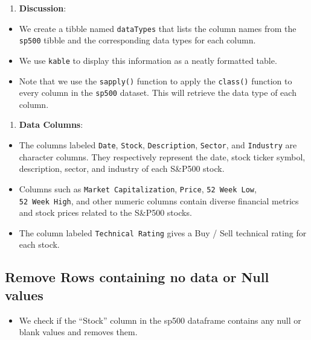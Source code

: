 \documentclass[
  letterpaper,
  DIV=11,
  numbers=noendperiod]{scrreport}
\providecommand{\tightlist}{%
  \setlength{\itemsep}{0pt}\setlength{\parskip}{0pt}}\usepackage{longtable,booktabs,array}
\begin{document}
\begin{enumerate}
\def\labelenumi{\arabic{enumi}.}
\setcounter{enumi}{2}
\tightlist
\item
  \textbf{Discussion}:
\end{enumerate}

\begin{itemize}
\item
  We create a tibble named \texttt{dataTypes} that lists the column
  names from the \texttt{sp500} tibble and the corresponding data types
  for each column.
\item
  We use \texttt{kable} to display this information as a neatly
  formatted table.
\item
  Note that we use the \texttt{sapply()} function to apply the
  \texttt{class()} function to every column in the \texttt{sp500}
  dataset. This will retrieve the data type of each column.
\end{itemize}

\begin{enumerate}
\def\labelenumi{\arabic{enumi}.}
\setcounter{enumi}{3}
\tightlist
\item
  \textbf{Data Columns}:
\end{enumerate}

\begin{itemize}
\item
  The columns labeled \texttt{Date}, \texttt{Stock},
  \texttt{Description}, \texttt{Sector}, and \texttt{Industry} are
  character columns. They respectively represent the date, stock ticker
  symbol, description, sector, and industry of each S\&P500 stock.
\item
  Columns such as \texttt{Market\ Capitalization}, \texttt{Price},
  \texttt{52\ Week\ Low}, \texttt{52\ Week\ High}, and other numeric
  columns contain diverse financial metrics and stock prices related to
  the S\&P500 stocks.
\item
  The column labeled \texttt{Technical\ Rating} gives a Buy / Sell
  technical rating for each stock.
\end{itemize}

\hypertarget{remove-rows-containing-no-data-or-null-values}{%
\subsection{Remove Rows containing no data or Null
values}\label{remove-rows-containing-no-data-or-null-values}}

\begin{itemize}
\tightlist
\item
  We check if the ``Stock'' column in the sp500 dataframe contains any
  null or blank values and removes them.
\end{itemize}
\end{document}
